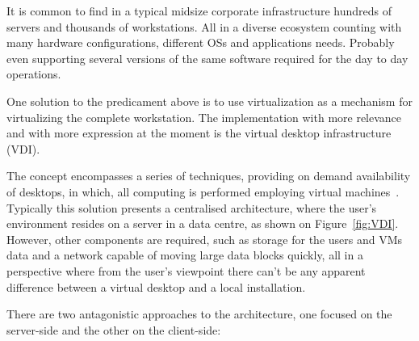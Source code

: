 
It is common to find in a typical midsize corporate infrastructure hundreds of servers and thousands of workstations. All in a diverse ecosystem counting with many hardware configurations, different OSs and applications needs. Probably even supporting several versions of the same software required for the day to day operations.

One solution to the predicament above is to use virtualization as a mechanism for virtualizing the complete workstation. The implementation with more relevance and with more expression at the moment is the virtual desktop infrastructure (VDI).

The concept encompasses a series of techniques, providing on demand availability of desktops, in which, all computing is performed employing virtual machines~\cite{VMWare_VDI2006}.
Typically this solution presents a centralised architecture, where the user's environment resides on a server in a data centre, as shown on Figure~\ref{fig:VDI}. However, other components are required, such as storage for the users and VMs data and a network capable of moving large data blocks quickly, all in a perspective where from the user's viewpoint there can't be any apparent difference between a virtual desktop and a local installation.

There are two antagonistic approaches to the architecture, one focused on the server-side and the other on the client-side:

